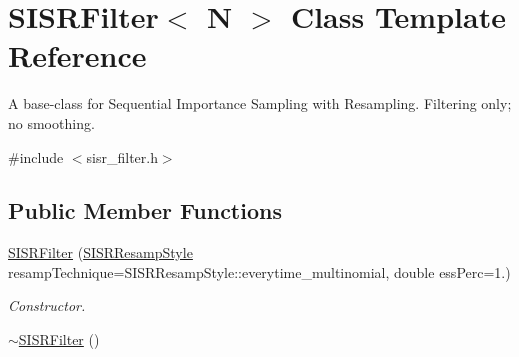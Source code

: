 \hypertarget{classSISRFilter}{}\section{S\+I\+S\+R\+Filter$<$ N $>$ Class Template Reference}
\label{classSISRFilter}


A base-\/class for Sequential Importance Sampling with Resampling. Filtering only; no smoothing.  




{\ttfamily \#include $<$sisr\+\_\+filter.\+h$>$}

\subsection*{Public Member Functions}
\begin{DoxyCompactItemize}
\item 
\hyperlink{classSISRFilter_af0474d774f660314e3e29948c05afa3c}{S\+I\+S\+R\+Filter} (\hyperlink{sisr__filter_8h_a2486051fd2028dedca520d3e0f8fd92f}{S\+I\+S\+R\+Resamp\+Style} resamp\+Technique=S\+I\+S\+R\+Resamp\+Style\+::everytime\+\_\+multinomial, double ess\+Perc=1.)
\begin{DoxyCompactList}\small\item\em Constructor. \end{DoxyCompactList}\item 
\hyperlink{classSISRFilter_af0ef8582352972c614720f0dea2fe15f}{$\sim$\+S\+I\+S\+R\+Filter} ()\hypertarget{classSISRFilter_af0ef8582352972c614720f0dea2fe15f}{}\label{classSISRFilter_af0ef8582352972c614720f0dea2fe15f}


\end{DoxyCompactItemize}
